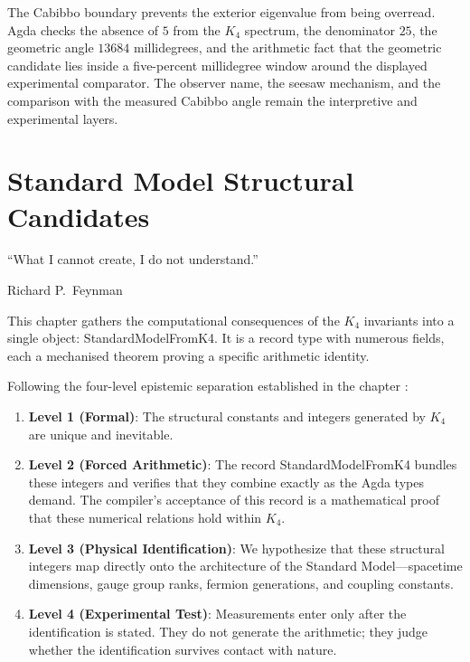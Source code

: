 \documentclass[11pt,a4paper]{book}
\def\texttt#1{#1}%
\begin{document}
The Cabibbo boundary prevents the exterior eigenvalue from being overread.
Agda checks the absence of $5$ from the $K_4$ spectrum, the denominator $25$,
the geometric angle $13684$ millidegrees, and the arithmetic fact that the
geometric candidate lies inside a five-percent millidegree window around the
displayed experimental comparator.  The observer name, the seesaw mechanism,
and the comparison with the measured Cabibbo angle remain the interpretive and
experimental layers.

\chapter{Standard Model Structural Candidates}
\label{ch:master-record}

\epigraph{``What I cannot create, I do not understand.''}{Richard P.~Feynman}

This chapter gathers the computational consequences of the $K_4$ invariants into a single object: \texttt{StandardModelFromK4}. It is a record type with numerous fields, each a mechanised theorem proving a specific arithmetic identity. 

Following the four-level epistemic separation established in the chapter \emph{}:
\begin{enumerate}
\item \textbf{Level 1 (Formal)}: The structural constants and integers generated by $K_4$ are unique and inevitable.
\item \textbf{Level 2 (Forced Arithmetic)}: The record \texttt{StandardModelFromK4} bundles these integers and verifies that they combine exactly as the Agda types demand. The compiler's acceptance of this record is a mathematical proof that these numerical relations hold within $K_4$.
\item \textbf{Level 3 (Physical Identification)}: We hypothesize that these structural integers map directly onto the architecture of the Standard Model---spacetime dimensions, gauge group ranks, fermion generations, and coupling constants.
\item \textbf{Level 4 (Experimental Test)}: Measurements enter only after the identification is stated. They do not generate the arithmetic; they judge whether the identification survives contact with nature.
\end{enumerate}
\end{document}
